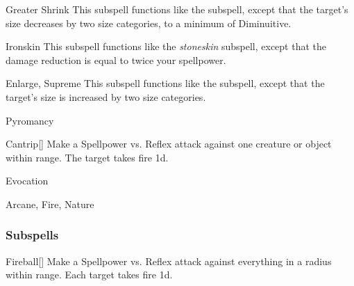 \begin{ability}[\nth{6}]{Greater Shrink}
This subspell functions like the  subspell, except that the target's size decreases by two size categories, to a minimum of Diminuitive.
\end{ability}
\vspace{0.25em}


\begin{ability}[\nth{7}]{Ironskin}
This subspell functions like the \textit{stoneskin} subspell, except that the damage reduction is equal to twice your spellpower.
\end{ability}
\vspace{0.25em}


\begin{ability}[\nth{9}]{Enlarge, Supreme}
This subspell functions like the  subspell, except that the target's size is increased by two size categories.
\end{ability}
\vspace{0.25em}

\newpage
\begin{spellsection}{Pyromancy}

\begin{spellheader}
\end{spellheader}


\begin{ability}{Cantrip}[]
Make a Spellpower vs. Reflex attack against one creature or object within \rngmed range.
\hit The target takes fire  \minus1d.
\end{ability}




 Evocation

 Arcane, Fire, Nature
\end{spellsection}


\subsubsection{Subspells}


\begin{ability}[\nth{1}]{Fireball}[]
Make a Spellpower vs. Reflex attack against everything in a \areasmall radius within \rngclose range.
\hit Each target takes fire  \minus1d.
\end{ability}
\vspace{0.25em}


